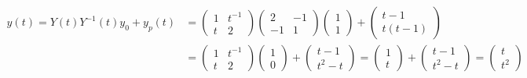 \begin{solution}
    \begin{align*}
        y(t) = Y(t) Y^{-1}(t) y_0 + y_p(t) &= 
        \begin{pmatrix}
            1 & t^{-1} \\
            t & 2
        \end{pmatrix}
        \begin{pmatrix}
            2 & -1 \\
            -1 & 1
        \end{pmatrix} 
        \begin{pmatrix} 1 \\ 1 \end{pmatrix} + \begin{pmatrix} t - 1 \\ t(t - 1) \end{pmatrix} \\
        &= 
        \begin{pmatrix}
            1 & t^{-1} \\
            t & 2
        \end{pmatrix}
        \begin{pmatrix} 1 \\ 0 \end{pmatrix} + \begin{pmatrix} t - 1 \\ t^2 - t \end{pmatrix} = \begin{pmatrix} 1 \\ t \end{pmatrix} + \begin{pmatrix} t - 1 \\ t^2 - t \end{pmatrix} = \begin{pmatrix}
            t \\ t^2
        \end{pmatrix}
    \end{align*}
\end{solution}

